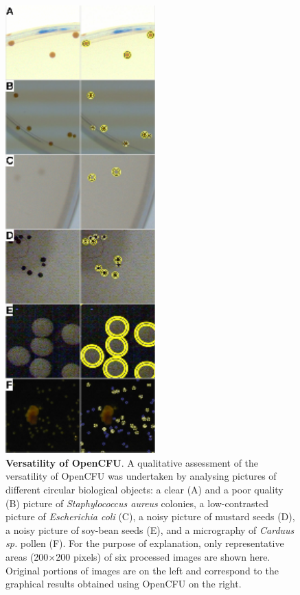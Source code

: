 \documentclass[10pt]{article}
\newcommand{\sa}{\emph{Staphylococcus aureus}}
\begin{document}
\begin{figure}[!ht]

\begin{center}
\includegraphics[width=2.27in]{./fig6.eps}
\end{center}

\caption{{\bf Versatility of OpenCFU}.
A qualitative assessment of the versatility of OpenCFU was undertaken by 
analysing pictures of different circular biological objects:
a clear (A) and a poor quality (B) picture of \sa{} colonies,
a low-contrasted picture of \emph{Escherichia coli} (C),
a noisy picture of mustard seeds (D),
a noisy picture of soy-bean seeds (E),
and a micrography of \emph{Carduus sp.} pollen (F).
For the purpose of explanation, only representative areas (200$\times{}$200 pixels)
of six processed images are shown here.
Original portions of images are on the left and correspond to 
the graphical results obtained using OpenCFU on the right.
}
\label{figVersat}
\end{figure}
\end{document}
